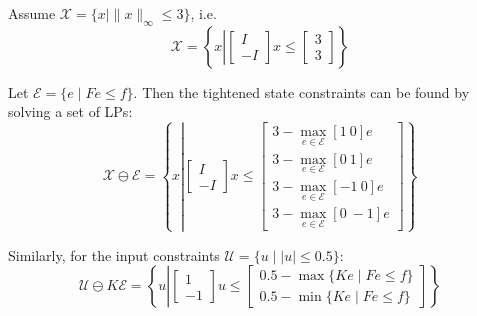 \begin{examplesection}
    Assume $\mathcal{X} = \{x \mid \|x\|_\infty \leq 3\}$, i.e.
    \begin{equation*}
        \mathcal{X} = \left\{ x \left|
        \begin{bmatrix}
            I \\ -I
        \end{bmatrix} x \leq
        \begin{bmatrix}
            3 \\ 3
        \end{bmatrix}
        \right. \right\}
    \end{equation*}

    Let $\mathcal{E} = \{e \mid F e \leq f\}$. Then the tightened state constraints can be found by solving a set of LPs:
    \begin{equation*}
        \mathcal{X} \ominus \mathcal{E} = \left\{ x \left|
        \begin{bmatrix}
            I \\ -I
        \end{bmatrix} x \leq
        \begin{bmatrix}
            3 - \max\limits_{e \in \mathcal{E}} [1 \ 0] e  \\
            3 - \max\limits_{e \in \mathcal{E}} [0 \ 1] e  \\
            3 - \max\limits_{e \in \mathcal{E}} [-1 \ 0] e \\
            3 - \max\limits_{e \in \mathcal{E}} [0 \ -1] e
        \end{bmatrix}
        \right. \right\}
    \end{equation*}

    Similarly, for the input constraints $\mathcal{U} = \{u \mid |u| \leq 0.5\}$:
    \begin{equation*}
        \mathcal{U} \ominus K \mathcal{E} = \left\{ u \left|
        \begin{bmatrix}
            1 \\ -1
        \end{bmatrix} u \leq
        \begin{bmatrix}
            0.5 - \max\{K e \mid F e \leq f\} \\
            0.5 - \min\{K e \mid F e \leq f\}
        \end{bmatrix}
        \right. \right\}
    \end{equation*}
\end{examplesection}

